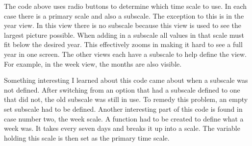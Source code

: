 \documentclass[letterpaper,10pt,titlepage,journal,compsoc,draftclsnofoot,onecolumn]{IEEEtran}
\newcommand\tab[1][1cm]{\hspace*{#1}}
\begin{document}
\tab
The code above uses radio buttons to determine which time scale to use. In each case there is a primary scale and also a subscale. The exception to this is in the year view. In this view there is no subscale because this view is used to see the largest picture possible. When adding in a subscale all values in that scale must fit below the desired year. This effectively zooms in making it hard to see a full year in one screen. The other views each have a subscale to help define the view. For example, in the week view, the months are also visible.
\newline

\tab
Something interesting I learned about this code came about when a subscale was not defined. After switching from an option that had a subscale defined to one that did not, the old subscale was still in use. To remedy this problem, an empty set subscale had to be defined. Another interesting part of this code is found in case number two, the week scale. A function had to be created to define what a week was. It takes every seven days and breaks it up into a scale. The variable holding this scale is then set as the primary time scale.
\newline
\end{document}
